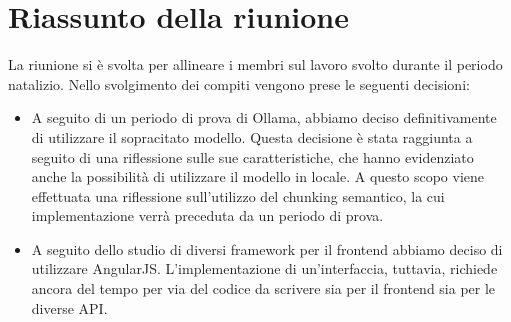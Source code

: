 \section{Riassunto della riunione}
La riunione si è svolta per allineare i membri sul lavoro svolto durante il periodo natalizio. Nello svolgimento dei compiti vengono prese le seguenti decisioni: 
\begin{itemize}
    \item A seguito di un periodo di prova di Ollama, abbiamo deciso definitivamente di utilizzare il sopracitato modello. Questa decisione è stata raggiunta a seguito di una riflessione sulle sue caratteristiche, che hanno evidenziato anche la possibilità di utilizzare il modello in locale. A questo scopo viene effettuata una riflessione sull'utilizzo del chunking semantico, la cui implementazione verrà preceduta da un periodo di prova.
    \item A seguito dello studio di diversi framework per il frontend abbiamo deciso di utilizzare AngularJS. L'implementazione di un'interfaccia, tuttavia, richiede ancora del tempo per via del codice da scrivere sia per il frontend sia per le diverse API.
\end{itemize}